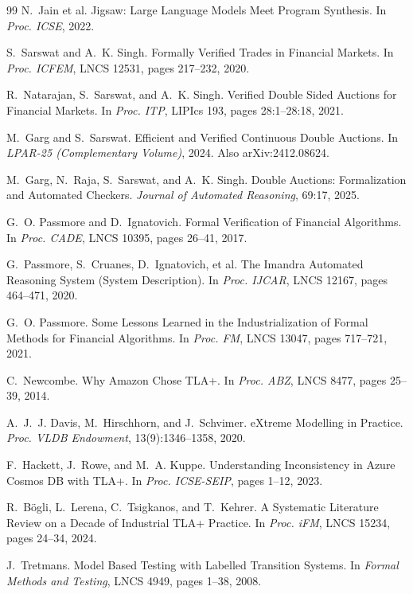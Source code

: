 \documentclass[11pt,a4paper]{article}
\begin{document}
\begin{thebibliography}{99}
N.~Jain et al.
Jigsaw: Large Language Models Meet Program Synthesis.
In \emph{Proc. ICSE}, 2022.

S.~Sarswat and A.~K. Singh.
Formally Verified Trades in Financial Markets.
In \emph{Proc. ICFEM}, LNCS 12531, pages 217--232, 2020.

R.~Natarajan, S.~Sarswat, and A.~K. Singh.
Verified Double Sided Auctions for Financial Markets.
In \emph{Proc. ITP}, LIPIcs 193, pages 28:1--28:18, 2021.

M.~Garg and S.~Sarswat.
Efficient and Verified Continuous Double Auctions.
In \emph{LPAR-25 (Complementary Volume)}, 2024. Also arXiv:2412.08624.

M.~Garg, N.~Raja, S.~Sarswat, and A.~K. Singh.
Double Auctions: Formalization and Automated Checkers.
\emph{Journal of Automated Reasoning}, 69:17, 2025.

G.~O. Passmore and D.~Ignatovich.
Formal Verification of Financial Algorithms.
In \emph{Proc. CADE}, LNCS 10395, pages 26--41, 2017.

G.~Passmore, S.~Cruanes, D.~Ignatovich, et al.
The Imandra Automated Reasoning System (System Description).
In \emph{Proc. IJCAR}, LNCS 12167, pages 464--471, 2020.

G.~O. Passmore.
Some Lessons Learned in the Industrialization of Formal Methods for
Financial Algorithms.
In \emph{Proc. FM}, LNCS 13047, pages 717--721, 2021.

C.~Newcombe.
Why Amazon Chose TLA+.
In \emph{Proc. ABZ}, LNCS 8477, pages 25--39, 2014.

A.~J.~J. Davis, M.~Hirschhorn, and J.~Schvimer.
eXtreme Modelling in Practice.
\emph{Proc. VLDB Endowment}, 13(9):1346--1358, 2020.

F.~Hackett, J.~Rowe, and M.~A. Kuppe.
Understanding Inconsistency in Azure Cosmos DB with TLA+.
In \emph{Proc. ICSE-SEIP}, pages 1--12, 2023.

R.~B\"ogli, L.~Lerena, C.~Tsigkanos, and T.~Kehrer.
A Systematic Literature Review on a Decade of Industrial TLA+ Practice.
In \emph{Proc. iFM}, LNCS 15234, pages 24--34, 2024.

J.~Tretmans.
Model Based Testing with Labelled Transition Systems.
In \emph{Formal Methods and Testing}, LNCS 4949, pages 1--38, 2008.


\end{thebibliography}
\end{document}
